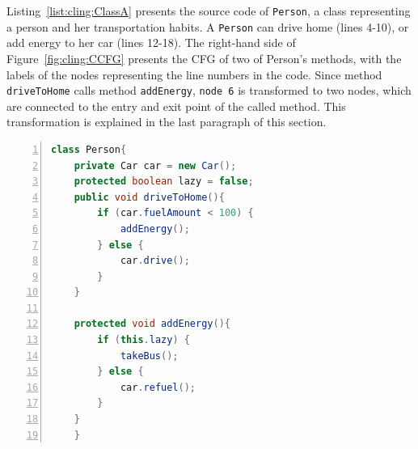 
Listing~\ref{list:cling:ClassA} presents the source code of \texttt{Person}, a class representing a person and her transportation habits. A \texttt{Person} can drive home (lines 4-10), or add energy to her car (lines 12-18). The right-hand side of Figure~\ref{fig:cling:CCFG} presents the CFG of two of Person's methods, with the labels of the nodes representing the line numbers in the code. Since method \texttt{driveToHome} calls method \texttt{addEnergy}, \texttt{node 6} is transformed to two nodes, which are connected to the entry and exit point of the called method. This transformation is explained in the last paragraph of this section. 

\begin{lstlisting}[frame=tb,
    caption={Class \texttt{Person}},
    label=list:cling:ClassA,
    language=java,
    captionpos=t,
    numbers=left,
    belowskip=-2.5em,
    float=t,
    firstnumber=1]
class Person{
    private Car car = new Car();
    protected boolean lazy = false;
    public void driveToHome(){
        if (car.fuelAmount < 100) {
            addEnergy();
        } else {
            car.drive();
        }   
    }

    protected void addEnergy(){
        if (this.lazy) {
            takeBus();
        } else {
            car.refuel();
        }
    }   
    }
  \end{lstlisting}
  
